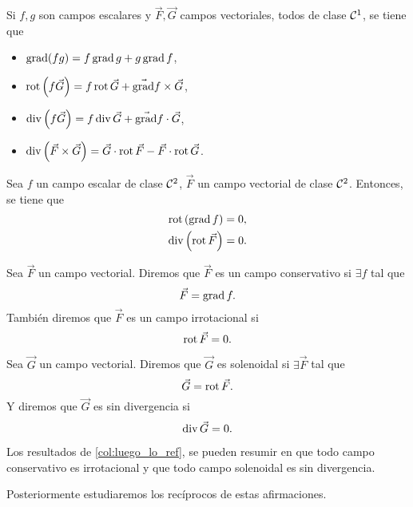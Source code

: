 \begin{prop}
    Si $f,g$ son campos escalares y $\vec{F},\vec{G}$ campos vectoriales, todos de clase $\mathcal{C}^1$, se tiene que
    \begin{itemize}
        \item $\operatorname{grad}(fg) = f \operatorname{grad} g + g \operatorname{grad} f$,
        \item $\operatorname{rot} \left( f \vec{G} \right) = f \operatorname{rot} \vec{G} + \vec{\operatorname{grad}} f \times \vec{G}$,
        \item $\operatorname{div} \left( f \vec{G} \right) = f \operatorname{div} \vec{G} + \vec{\operatorname{grad}} f \cdot \vec{G}$,
        \item $\operatorname{div} \left( \vec{F} \times \vec{G} \right) = \vec{G} \cdot \operatorname{rot} \vec{F} - \vec{F}
            \cdot \operatorname{rot} \vec{G}$.
    \end{itemize}
\end{prop}

\begin{col}[T. Schwarz]\label{col:luego_lo_ref}
    Sea $f$ un campo escalar de clase $\mathcal{C}^2$, $\vec{F}$ un campo vectorial de clase $\mathcal{C}^2$. Entonces, se tiene que
    \begin{gather*}
        \operatorname{rot}\left( \operatorname{grad} f \right) = 0, \\
        \operatorname{div} \left( \operatorname{rot} \vec{F} \right) = 0.
    \end{gather*}
\end{col}

\begin{defi}
    Sea $\vec{F}$ un campo vectorial. Diremos que $\vec{F}$ es un campo conservativo si $\exists f$ tal que
    \[
        \vec{F} = \operatorname{grad} f.
    \]
    Tambi\'en diremos que $\vec{F}$ es un campo irrotacional si
    \[
        \operatorname{rot} \vec{F} = 0.
    \]
\end{defi}
\begin{defi}
    Sea $\vec{G}$ un campo vectorial. Diremos que $\vec{G}$ es solenoidal si $\exists \vec{F}$ tal que
    \[
        \vec{G} = \operatorname{rot} \vec{F}.
    \]
    Y diremos que $\vec{G}$ es sin divergencia si
    \[
        \operatorname{div} \vec{G} = 0.
    \]
\end{defi}

\begin{obs}
    Los resultados de \ref{col:luego_lo_ref}, se pueden resumir en que todo campo conservativo es irrotacional y que todo
    campo solenoidal es sin divergencia.

    Posteriormente estudiaremos los recíprocos de estas afirmaciones.
\end{obs}

